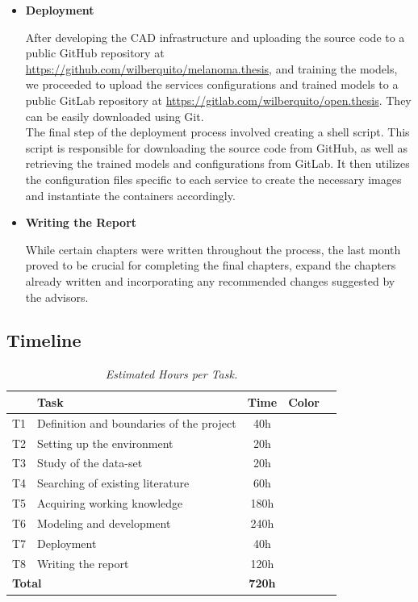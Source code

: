 \begin{itemize}
  \item{\textbf{Deployment}}

    After developing the CAD infrastructure and uploading the source code to a
    public GitHub repository at
    \url{https://github.com/wilberquito/melanoma.thesis}, and training the
    models, we proceeded to upload the services configurations and trained
    models to a public GitLab repository at
    \url{https://gitlab.com/wilberquito/open.thesis}. They can be easily
    downloaded using Git. \\

    The final step of the deployment process involved creating a shell script.
    This script is responsible for downloading the source code from GitHub, as
    well as retrieving the trained models and configurations from GitLab. It
    then utilizes the configuration files specific to each service to create
    the necessary images and instantiate the containers accordingly.

  \item{\textbf{Writing the Report}}

    While certain chapters were written throughout the process, the last month
    proved to be crucial for completing the final chapters, expand the chapters
    already written and incorporating any recommended changes suggested by the
    advisors.

\end{itemize}

\newpage

\subsection{Timeline}

\begin{table}[H] \centering
  \begin{tabular}{| l | l | c | c | c |}
    \hline
    \textbf{} & \textbf{Task} & \textbf{Time} & \textbf{Color} \\ \hline
    T1 &    Definition and boundaries of the project & 40h & \cellcolor{red!50} \\ \hline
    T2 &    Setting up the environment & 20h & \cellcolor{lime!50} \\ \hline
    T3 &    Study of the data-set & 20h & \cellcolor{blue!40} \\ \hline
    T4 &    Searching of existing literature & 60h & \cellcolor{teal!50} \\ \hline
    T5 &    Acquiring working knowledge & 180h & \cellcolor{amber!30} \\ \hline
    T6 &    Modeling and development & 240h & \cellcolor{black!70} \\ \hline
    T7 &    Deployment & 40h & \cellcolor{gray!50} \\ \hline
    T8 &    Writing the report & 120h & \cellcolor{orange!50} \\ \hline
    \multicolumn{2}{|l|}{\textbf{Total}} & \textbf{720h} & \\ \hline
  \end{tabular}
  \caption[Estimated Hours per Task.]{\textit{Estimated Hours per Task. }}
  {\label{table:timeline_tasks}}
\end{table}

